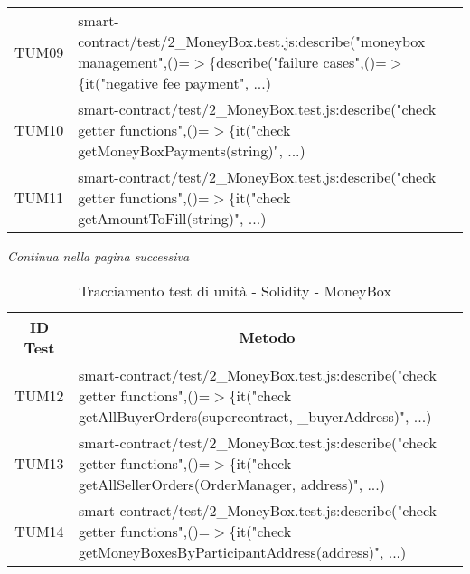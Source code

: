\begin{table}[H]
\begin{tabular}{c|p{15cm}}
    TUM09 & smart-contract/test/2\_MoneyBox.test.js:describe("moneybox management",\newline()=$>$\{describe("failure cases",()=$>$\{it("negative fee payment", ...)                              \\
    TUM10 & smart-contract/test/2\_MoneyBox.test.js:describe("check getter functions",\newline()=$>$\{it("check getMoneyBoxPayments(string)", ...)                                               \\
    TUM11 & smart-contract/test/2\_MoneyBox.test.js:describe("check getter functions",\newline()=$>$\{it("check getAmountToFill(string)", ...)                                                   \\
  \end{tabular}
\end{table}
\begin{center}
  \textit{\small Continua nella pagina successiva}
\end{center}
\begin{table}[H]
  \centering
  \renewcommand{\arraystretch}{1.8}
  \begin{tabular}{c|p{15cm}}
    \rowcolor[HTML]{125E28}
    \color[HTML]{FFFFFF}\textbf{ID Test}
          & \multicolumn{1}{c}{\color[HTML]{FFFFFF}\textbf{Metodo}}                                                                                                     \\
    \hline
    TUM12 & smart-contract/test/2\_MoneyBox.test.js:describe("check getter functions",\newline()=$>$\{it("check getAllBuyerOrders(supercontract, \_buyerAddress)", ...) \\
    TUM13 & smart-contract/test/2\_MoneyBox.test.js:describe("check getter functions",\newline()=$>$\{it("check getAllSellerOrders(OrderManager, address)", ...)        \\
    TUM14 & smart-contract/test/2\_MoneyBox.test.js:describe("check getter functions",\newline()=$>$\{it("check getMoneyBoxesByParticipantAddress(address)", ...)       \\
  \end{tabular}
  \caption{Tracciamento test di unità - Solidity - MoneyBox}
\end{table}